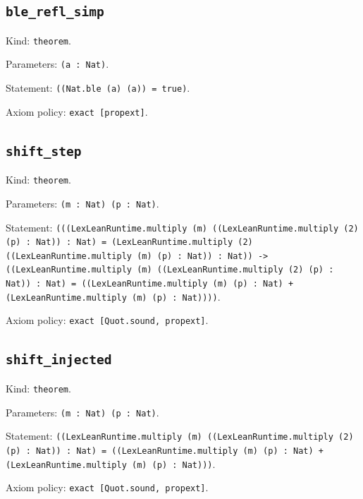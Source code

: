\documentclass[11pt]{article}
\begin{document}
\subsection*{\texttt{ble\_refl\_simp}}
\noindent Kind: \texttt{theorem}.\par
\noindent Parameters: \texttt{(a : Nat)}.\par
\noindent Statement: \texttt{((Nat.ble (a) (a)) = true)}.\par
\noindent Axiom policy: \texttt{exact [propext]}.\par
\subsection*{\texttt{shift\_step}}
\noindent Kind: \texttt{theorem}.\par
\noindent Parameters: \texttt{(m : Nat) (p : Nat)}.\par
\noindent Statement: \texttt{(((LexLeanRuntime.multiply (m) ((LexLeanRuntime.multiply (2) (p) : Nat)) : Nat) = (LexLeanRuntime.multiply (2) ((LexLeanRuntime.multiply (m) (p) : Nat)) : Nat)) -> ((LexLeanRuntime.multiply (m) ((LexLeanRuntime.multiply (2) (p) : Nat)) : Nat) = ((LexLeanRuntime.multiply (m) (p) : Nat) + (LexLeanRuntime.multiply (m) (p) : Nat))))}.\par
\noindent Axiom policy: \texttt{exact [Quot.sound, propext]}.\par
\subsection*{\texttt{shift\_injected}}
\noindent Kind: \texttt{theorem}.\par
\noindent Parameters: \texttt{(m : Nat) (p : Nat)}.\par
\noindent Statement: \texttt{((LexLeanRuntime.multiply (m) ((LexLeanRuntime.multiply (2) (p) : Nat)) : Nat) = ((LexLeanRuntime.multiply (m) (p) : Nat) + (LexLeanRuntime.multiply (m) (p) : Nat)))}.\par
\noindent Axiom policy: \texttt{exact [Quot.sound, propext]}.\par
\end{document}
